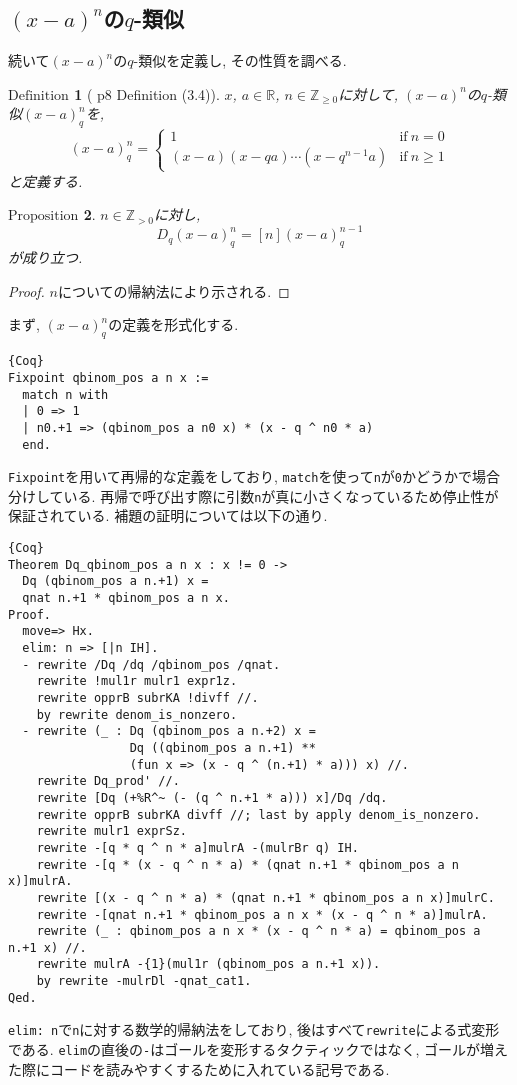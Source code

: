 \documentclass[11pt]{jsreport}
\theoremstyle{mystyle}
\newtheorem{df}{$\textrm{Definition}$}[section]
\newtheorem{prop}[df]{$\textrm{Proposition}$}
\newcommand{\bdf}{\begin{shadebox} \begin{df}}
\newcommand{\edf}{\end{df} \end{shadebox}}
\newcommand{\bprop}{\begin{shadebox} \begin{prop}}
\newcommand{\eprop}{\end{prop} \end{shadebox}}
\newcommand{\bpf}{\begin{proof}}
\newcommand{\epf}{\end{proof}}
\newcommand{\Z}{\mathbb{Z}}
\newcommand{\R}{\mathbb{R}}
\newcommand{\0}{\textbf{0}}
\begin{document}
\subsection{$(x - a)^n$の$q$-類似}
続いて$(x - a)^n$の$q$-類似を定義し, その性質を調べる.  
\bdf[\cite{Kac} p8 Definition (3.4)]
  $x$, $a \in \R$, $n \in \Z_{\ge 0}$に対して, $(x - a)^n$の$q$-類似$(x - a)^n_q$を, 
  \[
  (x - a)^n_q = \begin{cases}
                      1 & \text{if}\ n = 0 \\
                      (x - a) (x - qa) \cdots (x - q^{n - 1} a) & \text{if}\ n \ge 1
                    \end{cases}
  \]
  と定義する. 
\edf
\bprop \label{Dq_qbinom_nonneg}
  $n\in\Z_{>0}$に対し, 
  \[
    D_q(x-a)^n_q = [n](x-a)^{n-1}_q
  \]
  が成り立つ. 
\eprop
\bpf
  $n$についての帰納法により示される. 
\epf
まず, $(x - a)^n_q$の定義を形式化する. 
\begin{lstlisting}{Coq}
Fixpoint qbinom_pos a n x :=
  match n with
  | 0 => 1
  | n0.+1 => (qbinom_pos a n0 x) * (x - q ^ n0 * a)
  end. \end{lstlisting}
{\tt Fixpoint}を用いて再帰的な定義をしており, {\tt match}を使って{\tt n}が{\tt 0}かどうかで場合分けしている. 再帰で呼び出す際に引数{\tt n}が真に小さくなっているため停止性が保証されている. 補題の証明については以下の通り. 
\begin{lstlisting}{Coq}
Theorem Dq_qbinom_pos a n x : x != 0 ->
  Dq (qbinom_pos a n.+1) x =
  qnat n.+1 * qbinom_pos a n x.
Proof.
  move=> Hx.
  elim: n => [|n IH].
  - rewrite /Dq /dq /qbinom_pos /qnat.
    rewrite !mul1r mulr1 expr1z.
    rewrite opprB subrKA !divff //.
    by rewrite denom_is_nonzero.
  - rewrite (_ : Dq (qbinom_pos a n.+2) x =
                 Dq ((qbinom_pos a n.+1) **
                 (fun x => (x - q ^ (n.+1) * a))) x) //.
    rewrite Dq_prod' //.
    rewrite [Dq (+%R^~ (- (q ^ n.+1 * a))) x]/Dq /dq.
    rewrite opprB subrKA divff //; last by apply denom_is_nonzero.
    rewrite mulr1 exprSz.
    rewrite -[q * q ^ n * a]mulrA -(mulrBr q) IH.
    rewrite -[q * (x - q ^ n * a) * (qnat n.+1 * qbinom_pos a n x)]mulrA.
    rewrite [(x - q ^ n * a) * (qnat n.+1 * qbinom_pos a n x)]mulrC.
    rewrite -[qnat n.+1 * qbinom_pos a n x * (x - q ^ n * a)]mulrA.
    rewrite (_ : qbinom_pos a n x * (x - q ^ n * a) = qbinom_pos a n.+1 x) //.
    rewrite mulrA -{1}(mul1r (qbinom_pos a n.+1 x)).
    by rewrite -mulrDl -qnat_cat1.
Qed.
\end{lstlisting}
{\tt elim:\,n}で{\tt n}に対する数学的帰納法をしており, 後はすべて{\tt rewrite}による式変形である. {\tt elim}の直後の{\tt -}はゴールを変形するタクティックではなく, ゴールが増えた際にコードを読みやすくするために入れている記号である. 
\end{document}
